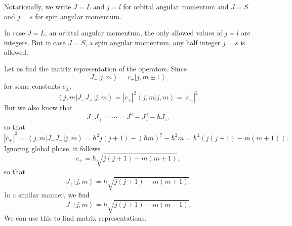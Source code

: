\documentclass[phys334]{subfiles}
\begin{document}
    \np Notationally, we write $J = L$ and $j=l$ for orbital angular momentum and $J=S$ and $j=s$ for spin angular momentum.

    \np In case $J = L$, an orbital angular momentum, the only allowed values of $j=l$ are integers. But in case $J=S$, a spin angular momentum, any half integer $j=s$ is allowed.

    \np Let us find the matrix representation of the operators. Since
    \begin{equation*}
        J_{\pm} \left| j,m \right\rangle = c_{\pm}\left| j,m\pm 1 \right\rangle
    \end{equation*}
    for some constants $c_{\pm}$,
    \begin{equation*}
        \left\langle j,m \right|J_-J_+\left| j,m \right\rangle = \left| c_+ \right|^{2} \left\langle j,m | j,m \right\rangle = \left| c_+ \right|^{2}.
    \end{equation*}
    But we also know that
    \begin{equation*}
        J_-J_+ = \cdots = J^{2}-J_z^{2}-\hbar J_z,
    \end{equation*}
    so that
    \begin{equation*}
        \left| c_+ \right|^{2} = \left\langle j,m \right|J_-J_+\left| j,m \right\rangle = \hbar^{2}j\left( j+1 \right)-\left( \hbar m \right)^{2}-\hbar^{2}m = \hbar^{2}\left( j\left( j+1 \right)-m\left( m+1 \right) \right).
    \end{equation*}
    Ignoring global phase, it follows
    \begin{equation*}
        c_+ = \hbar\sqrt{j\left( j+1 \right)-m\left( m+1 \right)},
    \end{equation*}
    so that
    \begin{equation*}
        J_+\left| j,m \right\rangle = \hbar\sqrt{j\left( j+1 \right)-m\left( m+1 \right)}.
    \end{equation*}
    In a similar manner, we find
    \begin{equation*}
        J_-\left| j,m \right\rangle = \hbar\sqrt{j\left( j+1 \right)-m\left( m-1 \right)}.
    \end{equation*}
    We can use this to find matrix representations.
\end{document}
